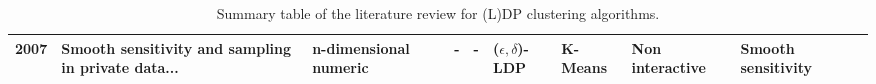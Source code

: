 \begin{landscape}
\begin{table}[ht]
\begin{tabular}{rlllllllll}
      2007 \citep{nissim_smooth_2007}                 & Smooth sensitivity and sampling in private data... & n-dimensional numeric             & -                                                  & -                                                  & ($\epsilon, \delta$)-LDP & K-Means             & Non interactive & Smooth sensitivity               \\
      \bottomrule
    \end{tabular}
    \caption{Summary table of the literature review for (L)DP clustering algorithms.}
    \label{tab:summary_table_kmeans}
  \end{table}


  \begin{table}[ht]
    \centering


\end{table}
\end{landscape}
